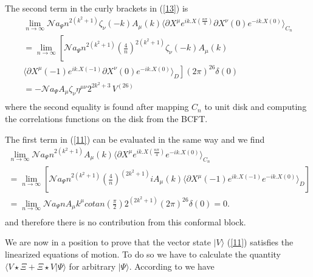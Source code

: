 \documentclass[a4paper,12pt]{article}
\begin{document}
The second term in the curly brackets in (\ref{13}) is
\begin{multline}
\lim_{n\to\infty}\mathcal{N}a_\Psi n^{2(k^2+1)}
\zeta_\nu(-k)A_\mu(k)
\langle\partial X^\mu e^{ik.X(\frac{n\pi}{4})}
\partial X^\nu(0) e^{-ik.X(0)} \rangle_{C_n}
\\
=\lim_{n\to\infty}\left[\mathcal{N}a_\Psi n^{2(k^2+1)}
\left(\frac 4n\right)^{2(k^2+1)}
\zeta_\nu(-k)A_\mu(k)\right. 
\\
\left. \langle\partial X^\mu(-1) e^{ik.X(-1)}
\partial X^\nu(0) e^{-ik.X(0)} \rangle_D\right](2\pi)^{26}\delta(0)
\\ 
=-\mathcal{N}a_\Psi A_\mu\zeta_\nu \eta^{\mu\nu}
 2^{2k^2+3}\, V^{(26)}
\\
\label{14}
\end{multline}
where the second equality is found after mapping $C_n$ to unit disk and 
computing the correlations functions on the disk from the BCFT.

The first term in (\ref{11}) can be evaluated in the same way and we find
\begin{multline}
\lim_{n\to\infty}\mathcal{N}a_\Psi n^{2(k^2+1)}
A_\mu(k)\langle\partial X^\mu e^{ik.X(\frac{n\pi}{4})}
 e^{-ik.X(0)} \rangle_{C_n}
\\
=\lim_{n\to\infty}\left[\mathcal{N}a_\Psi n^{2(k^2+1)}
\left(\frac 4n\right)^{(2k^2+1)}iA_\mu(k) 
\langle\partial X^\mu(-1) e^{ik.X(-1)}
 e^{-ik.X(0)} \rangle_D\right]
\\ 
=\lim_{n\to\infty}\mathcal{N}a_\Psi n A_\mu k^\mu cotan(\frac{\pi}{2})
 2^{(2k^2+1)}(2\pi)^{26}\delta(0)= 0.
\\
\label{15}
\end{multline}
and therefore there is no contribution from this conformal block.

We are now in a position to prove that the vector state $|V\rangle$ (\ref{11})
satisfies the linearized equations of motion. To do so we have to calculate 
the quantity $\langle V\star\Xi+\Xi\star V|\Psi\rangle$ for arbitrary
$|\Psi\rangle$. According to \cite{rsz3,rsz4,rv} we have
\end{document}
